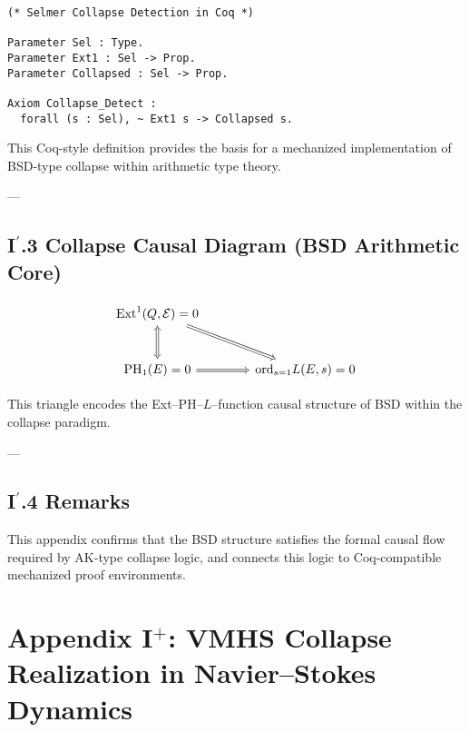 \documentclass[11pt]{article}
\begin{document}
\begin{lstlisting}[language=Coq, caption=Collapse Detection Axiom in Arithmetic Type Theory]
(* Selmer Collapse Detection in Coq *)

Parameter Sel : Type.
Parameter Ext1 : Sel -> Prop.
Parameter Collapsed : Sel -> Prop.

Axiom Collapse_Detect :
  forall (s : Sel), ~ Ext1 s -> Collapsed s.
\end{lstlisting}

This Coq-style definition provides the basis for a mechanized implementation  
of BSD-type collapse within arithmetic type theory.

---

\subsection*{I$^\prime$.3 Collapse Causal Diagram (BSD Arithmetic Core)}

\[
\begin{tikzcd}[row sep=large, column sep=large]
\mathrm{Ext}^1(Q, \mathcal{E}) = 0 \arrow[dr, Rightarrow] & \\
\mathrm{PH}_1(E) = 0 \arrow[u, Leftrightarrow] \arrow[r, Rightarrow] & \mathrm{ord}_{s=1} L(E,s) = 0
\end{tikzcd}
\]

This triangle encodes the Ext–PH–$L$–function causal structure of BSD within the collapse paradigm.

---

\subsection*{I$^\prime$.4 Remarks}

This appendix confirms that the BSD structure satisfies the  
formal causal flow required by AK-type collapse logic, and connects this logic  
to Coq-compatible mechanized proof environments.




\section*{Appendix I$^+$: VMHS Collapse Realization in Navier--Stokes Dynamics}
\end{document}
